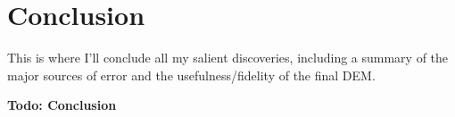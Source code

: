 \section{Conclusion}

This is where I'll conclude all my salient discoveries, including a summary of
the major sources of error and the usefulness/fidelity of the final DEM.

\textbf{Todo: Conclusion}
